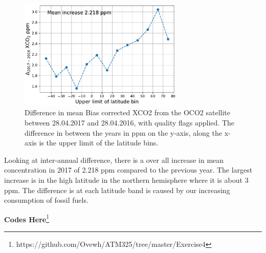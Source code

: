 \begin{figure}[htbp]
    \centering
    \includegraphics[width=0.7\textwidth]{../deltaXco2.pdf}
    \caption{Difference in mean Bias corrected XCO2 from the OCO2 satellite
    between 28.04.2017 and 28.04.2016, with quality flags applied. The
    difference in  between the years in ppm on the
    y-axis, along the x-axis is the upper limit of
    the latitude bins.}
    \label{fig:Deltaqa_xco2}

\end{figure}


Looking at inter-annual difference, there is a over all increase in mean
 concentration in 2017 of 2.218 ppm compared to the previous year. The
largest increase is in the high latitude in the northern hemisphere where it is
about 3 ppm. The difference is at each latitude band is caused by our
increasing consumption of fossil fuels. 

\textbf{Codes Here}\footnote{https://github.com/Ovewh/ATM325/tree/master/Exercise4}